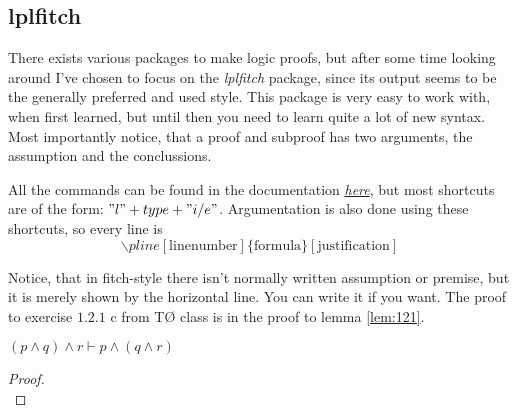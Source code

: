 \documentclass[a4, english, twoside]{article}
\begin{document}
\subsection{lplfitch}
There exists various packages to make logic proofs, but after some time looking around I've chosen to focus on the \emph{lplfitch} package, since its output seems to be the generally preferred and used style. This package is very easy to work with, when first learned, but until then you need to learn quite a lot of new syntax. Most importantly notice, that a proof and subproof has two arguments, the assumption and the conclussions.
\begin{center}
\end{center}

All the commands can be found in the documentation \href{http://mirrors.dotsrc.org/ctan/macros/latex/contrib/lplfitch/lplfitch.pdf}{\emph{here}}, but most shortcuts are of the form: $"l" + type + "i/e"$. Argumentation is also done using these shortcuts, so every line is
\begin{equation*}
    \backslash pline[\text{linenumber}]\{\text{formula}\}[\text{justification}]
\end{equation*}

Notice, that in fitch-style there isn't normally written assumption or premise, but it is merely shown by the horizontal line. You can write it if you want. The proof to exercise $1.2.1$ c from TØ class is in the proof to lemma \ref{lem:121}.
\begin{lemma} \label{lem:121}
    $(p \wedge q) \wedge r \vdash p \wedge (q \wedge r)$
\end{lemma}
\begin{proof}
     \\ %
\end{proof}
\end{document}
